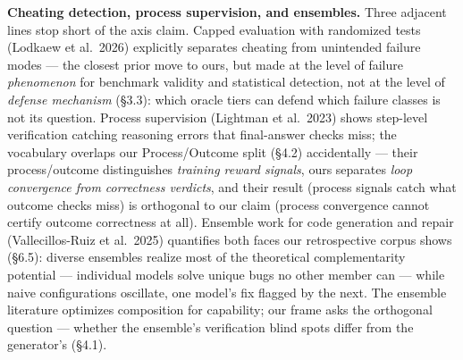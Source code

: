 \documentclass[
  11pt,
]{article}
\begin{document}
\textbf{Cheating detection, process supervision, and ensembles.} Three
adjacent lines stop short of the axis claim. Capped evaluation with
randomized tests (Lodkaew et al.~2026) explicitly separates cheating
from unintended failure modes --- the closest prior move to ours, but
made at the level of failure \emph{phenomenon} for benchmark validity
and statistical detection, not at the level of \emph{defense mechanism}
(§3.3): which oracle tiers can defend which failure classes is not its
question. Process supervision (Lightman et al.~2023) shows step-level
verification catching reasoning errors that final-answer checks miss;
the vocabulary overlaps our Process/Outcome split (§4.2) accidentally
--- their process/outcome distinguishes \emph{training reward signals},
ours separates \emph{loop convergence from correctness verdicts}, and
their result (process signals catch what outcome checks miss) is
orthogonal to our claim (process convergence cannot certify outcome
correctness at all). Ensemble work for code generation and repair
(Vallecillos-Ruiz et al.~2025) quantifies both faces our retrospective
corpus shows (§6.5): diverse ensembles realize most of the theoretical
complementarity potential --- individual models solve unique bugs no
other member can --- while naive configurations oscillate, one model's
fix flagged by the next. The ensemble literature optimizes composition
for capability; our frame asks the orthogonal question --- whether the
ensemble's verification blind spots differ from the generator's (§4.1).
\end{document}
